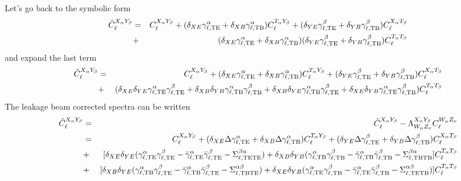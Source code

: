 \documentclass[a4paper, 11pt]{article}
\def\ba{\begin{eqnarray}}
\def\ea{\end{eqnarray}}
\begin{document}
Let's go back to the symbolic form 
\ba
\tilde{C}^{X_{\alpha} Y_{\beta}}_{\ell} &=&  C^{X_{\alpha} Y_{\beta}}_{\ell}   + (\delta_{XE}\gamma^{\alpha}_{\ell, \rm TE}  + \delta_{XB}\gamma^{\alpha}_{\ell, \rm TB}) C^{T_{\alpha} Y_{\beta}}_{\ell} +  (\delta_{YE}\gamma^{\beta}_{\ell, \rm TE}  + \delta_{YB}\gamma^{\beta}_{\ell, \rm TB})C^{X_{\alpha} T_{\beta}}_{\ell}  \nonumber \\
&+&  (\delta_{XE}\gamma^{\alpha}_{\ell, \rm TE}  + \delta_{XB}\gamma^{\alpha}_{\ell, \rm TB}) (\delta_{YE}\gamma^{\beta}_{\ell, \rm TE}  + \delta_{YB}\gamma^{\beta}_{\ell, \rm TB})C^{T_{\alpha} T_{\beta}}_{\ell}  
\ea
and expand the last term
\ba
\tilde{C}^{X_{\alpha} Y_{\beta}}_{\ell} &=&  C^{X_{\alpha} Y_{\beta}}_{\ell}   + (\delta_{XE}\gamma^{\alpha}_{\ell, \rm TE}  + \delta_{XB}\gamma^{\alpha}_{\ell, \rm TB}) C^{T_{\alpha} Y_{\beta}}_{\ell} +  (\delta_{YE}\gamma^{\beta}_{\ell, \rm TE}  + \delta_{YB}\gamma^{\beta}_{\ell, \rm TB})C^{X_{\alpha} T_{\beta}}_{\ell}  \nonumber \\
&+&  (\delta_{XE} \delta_{YE} \gamma^{\alpha}_{\ell, \rm TE}  \gamma^{\beta}_{\ell, \rm TE}  +  \delta_{XB} \delta_{YB}\gamma^{\alpha}_{\ell, \rm TB} \gamma^{\beta}_{\ell, \rm TB} + \delta_{XB}\delta_{YE}\gamma^{\alpha}_{\ell, \rm TB} \gamma^{\beta}_{\ell, \rm TE} + \delta_{XE}\delta_{YB}\gamma^{\alpha}_{\ell, \rm TE}  \gamma^{\beta}_{\ell, \rm TB}  )C^{T_{\alpha} T_{\beta}}_{\ell}  \nonumber \\
\ea
The leakage beam corrected spectra can be written
\ba
\hat{C}^{X_{\alpha} Y_{\beta}}_{\ell}  &=& \tilde{C}^{X_{\alpha} Y_{\beta}}_{\ell}  - \Lambda^{X_{\alpha} Y_{\beta}}_{W_{\mu} Z_{\nu}} C^{W_{\mu} Z_{\nu}}_{\ell}  \\
 &=&  C^{X_{\alpha} Y_{\beta}}_{\ell}   + (\delta_{XE} \Delta \gamma^{\alpha}_{\ell, \rm TE}  + \delta_{XB}\Delta \gamma^{\alpha}_{\ell, \rm TB}) C^{T_{\alpha} Y_{\beta}}_{\ell} +  (\delta_{YE}\Delta \gamma^{\beta}_{\ell, \rm TE}  + \delta_{YB}\Delta \gamma^{\beta}_{\ell, \rm TB})C^{X_{\alpha} T_{\beta}}_{\ell}  \nonumber \\
&+&  [\delta_{XE} \delta_{YE} (\gamma^{\alpha}_{\ell, \rm TE}  \gamma^{\beta}_{\ell, \rm TE} -  \bar{\gamma}^{\alpha}_{\ell, \rm TE}  \bar{\gamma}^{\beta}_{\ell, \rm TE} - \Sigma^{\beta \alpha}_{\ell, \rm  TE TE} ) +  \delta_{XB} \delta_{YB}(\gamma^{\alpha}_{\ell, \rm TB} \gamma^{\beta}_{\ell, \rm TB} - \bar{\gamma}^{\alpha}_{\ell, \rm TB} \bar{\gamma}^{\beta}_{\ell, \rm TB} -  \Sigma^{\beta \alpha}_{\ell, \rm  TB TB} ]C^{T_{\alpha} T_{\beta}}_{\ell}  \nonumber \\
&+& [\delta_{XB}\delta_{YE}(\gamma^{\alpha}_{\ell, \rm TB} \gamma^{\beta}_{\ell, \rm TE} - \bar{\gamma}^{\alpha}_{\ell, \rm TB} \bar{\gamma}^{\beta}_{\ell, \rm TE} - \Sigma^{ \alpha \beta}_{\ell, \rm  TB TE})  + \delta_{XE}\delta_{YB}(\gamma^{\alpha}_{\ell, \rm TE}  \gamma^{\beta}_{\ell, \rm TB} - \bar{\gamma}^{\alpha}_{\ell, \rm TE}  \bar{\gamma}^{\beta}_{\ell, \rm TB} - \Sigma^{ \alpha \beta}_{\ell, \rm  TE TB})  ]C^{T_{\alpha} T_{\beta}}_{\ell}  \nonumber \\\ea
\end{document}
